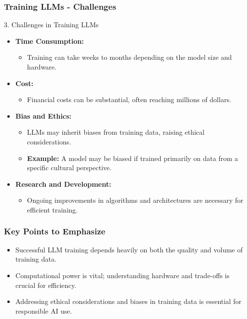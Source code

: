 \documentclass[aspectratio=169]{beamer}
\begin{document}
\begin{frame}[fragile]
    \frametitle{Training LLMs - Challenges}
    \begin{block}{3. Challenges in Training LLMs}
        \begin{itemize}
            \item \textbf{Time Consumption:} 
                \begin{itemize}
                    \item Training can take weeks to months depending on the model size and hardware.
                \end{itemize}
            \item \textbf{Cost:} 
                \begin{itemize}
                    \item Financial costs can be substantial, often reaching millions of dollars.
                \end{itemize}
            \item \textbf{Bias and Ethics:}
                \begin{itemize}
                    \item LLMs may inherit biases from training data, raising ethical considerations.
                    \item \textbf{Example:} A model may be biased if trained primarily on data from a specific cultural perspective.
                \end{itemize}
            \item \textbf{Research and Development:}
                \begin{itemize}
                    \item Ongoing improvements in algorithms and architectures are necessary for efficient training.
                \end{itemize}
        \end{itemize}
    \end{block}
\end{frame}

\begin{frame}[fragile]
    \frametitle{Key Points to Emphasize}
    \begin{itemize}
        \item Successful LLM training depends heavily on both the quality and volume of training data.
        \item Computational power is vital; understanding hardware and trade-offs is crucial for efficiency.
        \item Addressing ethical considerations and biases in training data is essential for responsible AI use.
    \end{itemize}
\end{frame}
\end{document}
